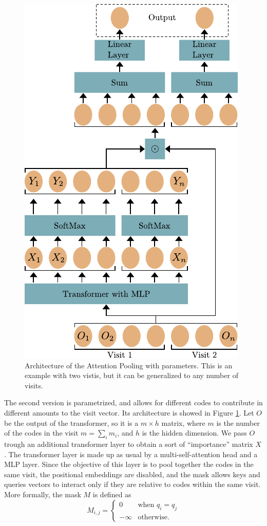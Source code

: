 \documentclass[]{marticle}
\begin{document}
\begin{figure}[!b] 
\center
\includegraphics{attention_pooling.pdf}
\caption{Architecture of the Attention Pooling with parameters. This is an example with two vistis,
but it can be generalized to any number of visits.}
\label{fig:pooling-architecture} 
\end{figure}

The second version is parametrized, and allows for different codes to contribute in different
amounts to the visit vector. Its architecture is showed in Figure \ref{fig:pooling-architecture}.
Let $O$ be the output of the transformer, so it is a $m \times h$ matrix, where $m$ is the number of
the codes in the visit $m=\sum_i m_i$, and $h$ is the hidden dimension. We pass $O$ trough an
additional transformer layer to obtain a sort of ``importance'' matrix $X$. The transformer layer is
made up as usual by a multi-self-attention head and a MLP layer. Since the objective of this layer
is to pool together the codes in the same visit, the positional embeddings are disabled, and the
mask allows keys and queries vectors to interact only if they are relative to codes within the same
visit. More formally, the mask $M$ is defined as 
\begin{equation*}
    M_{i,j} = \begin{cases}
        0       & \text{when $q_i = q_j$} \\
        -\infty & \text{otherwise.}
    \end{cases}
\end{equation*}
\end{document}
